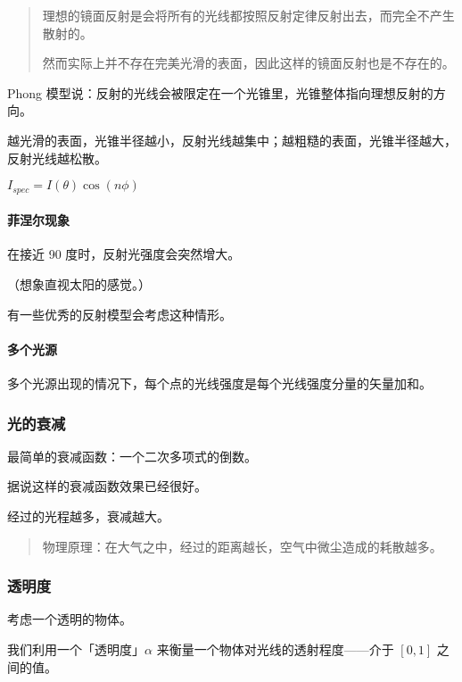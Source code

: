 \documentclass[
]{article}
\begin{document}
\begin{quote}
理想的镜面反射是会将所有的光线都按照反射定律反射出去，而完全不产生散射的。

然而实际上并不存在完美光滑的表面，因此这样的镜面反射也是不存在的。
\end{quote}

Phong
模型说：反射的光线会被限定在一个光锥里，光锥整体指向理想反射的方向。

越光滑的表面，光锥半径越小，反射光线越集中；越粗糙的表面，光锥半径越大，反射光线越松散。

\(I_{spec} = I(\theta) \cos(n\phi)\)

\hypertarget{header-n22}{%
\paragraph{菲涅尔现象}\label{header-n22}}

在接近 90 度时，反射光强度会突然增大。

（想象直视太阳的感觉。）

有一些优秀的反射模型会考虑这种情形。

\hypertarget{header-n26}{%
\paragraph{多个光源}\label{header-n26}}

多个光源出现的情况下，每个点的光线强度是每个光线强度分量的矢量加和。

\hypertarget{header-n28}{%
\subsubsection{光的衰减}\label{header-n28}}

最简单的衰减函数：一个二次多项式的倒数。

据说这样的衰减函数效果已经很好。

经过的光程越多，衰减越大。

\begin{quote}
物理原理：在大气之中，经过的距离越长，空气中微尘造成的耗散越多。
\end{quote}

\hypertarget{header-n34}{%
\subsubsection{透明度}\label{header-n34}}

考虑一个透明的物体。

我们利用一个「透明度」\(\alpha\)
来衡量一个物体对光线的透射程度------介于 \([0, 1]\) 之间的值。
\end{document}
